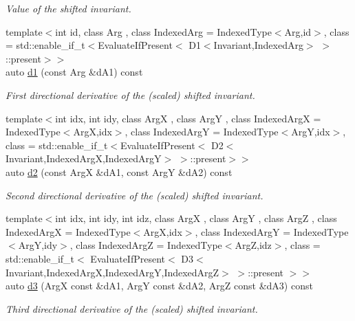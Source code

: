 \begin{DoxyCompactItemize}
\begin{DoxyCompactList}\small\item\em Value of the shifted invariant. \end{DoxyCompactList}\item 
{\footnotesize template$<$int id, class Arg , class Indexed\-Arg  = Indexed\-Type$<$\-Arg,id$>$, class  = std\-::enable\-\_\-if\-\_\-t$<$\-Evaluate\-If\-Present$<$ D1$<$\-Invariant,\-Indexed\-Arg$>$ $>$\-::present$>$$>$ }\\auto \hyperlink{classFunG_1_1LinearAlgebra_1_1ShiftedInvariant_ab7d717e4afed91638643b6dfe1638364}{d1} (const Arg \&d\-A1) const 
\begin{DoxyCompactList}\small\item\em First directional derivative of the (scaled) shifted invariant. \end{DoxyCompactList}\item 
{\footnotesize template$<$int idx, int idy, class Arg\-X , class Arg\-Y , class Indexed\-Arg\-X  = Indexed\-Type$<$\-Arg\-X,idx$>$, class Indexed\-Arg\-Y  = Indexed\-Type$<$\-Arg\-Y,idx$>$, class  = std\-::enable\-\_\-if\-\_\-t$<$\-Evaluate\-If\-Present$<$ D2$<$\-Invariant,\-Indexed\-Arg\-X,\-Indexed\-Arg\-Y$>$ $>$\-::present$>$$>$ }\\auto \hyperlink{classFunG_1_1LinearAlgebra_1_1ShiftedInvariant_a0909110ab26f6ff9496fbb81d801bf8d}{d2} (const Arg\-X \&d\-A1, const Arg\-Y \&d\-A2) const 
\begin{DoxyCompactList}\small\item\em Second directional derivative of the (scaled) shifted invariant. \end{DoxyCompactList}\item 
{\footnotesize template$<$int idx, int idy, int idz, class Arg\-X , class Arg\-Y , class Arg\-Z , class Indexed\-Arg\-X  = Indexed\-Type$<$\-Arg\-X,idx$>$, class Indexed\-Arg\-Y  = Indexed\-Type$<$\-Arg\-Y,idy$>$, class Indexed\-Arg\-Z  = Indexed\-Type$<$\-Arg\-Z,idz$>$, class  = std\-::enable\-\_\-if\-\_\-t$<$ Evaluate\-If\-Present$<$ D3$<$\-Invariant,\-Indexed\-Arg\-X,\-Indexed\-Arg\-Y,\-Indexed\-Arg\-Z$>$ $>$\-::present $>$$>$ }\\auto \hyperlink{classFunG_1_1LinearAlgebra_1_1ShiftedInvariant_a8b3a1b335855aa34c1179843b65217ab}{d3} (Arg\-X const \&d\-A1, Arg\-Y const \&d\-A2, Arg\-Z const \&d\-A3) const 
\begin{DoxyCompactList}\small\item\em Third directional derivative of the (scaled) shifted invariant. \end{DoxyCompactList}\end{DoxyCompactItemize}


